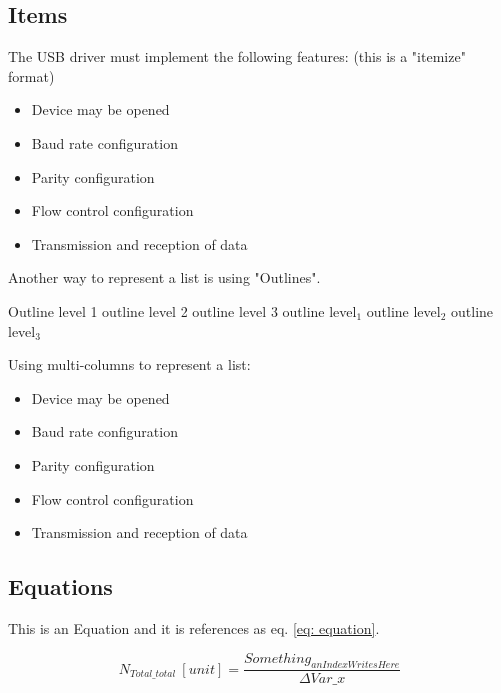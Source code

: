\subsection{Items}
The USB driver must implement the following features: (this is a "itemize" format)

\begin{itemize}
	\item Device may be opened
	\item Baud rate configuration
	\item Parity configuration
	\item Flow control configuration
	\item Transmission and reception of data
\end{itemize}


Another way to represent a list is using "Outlines".

\begin{outline}
	\1 Outline level 1
		\2 outline level 2
			\3 outline level 3
	\1 outline level$_{1}$
		\2 outline level$_{2}$
			\3 outline level$_{3}$
\end{outline}


Using multi-columns to represent a list:
\begin{multicols}{2}
\begin{itemize}
	\item Device may be opened
	\item Baud rate configuration
	\item Parity configuration
	\item Flow control configuration
	\item Transmission and reception of data
\end{itemize}
\end{multicols}



\subsection{Equations}
This is an Equation and it is references as eq. \ref{eq: equation}.

\begin{equation}
\label{eq: equation}
	N_{Total\_total} \ [unit] = \frac{Something_{anIndexWritesHere}}{\Delta Var\_x}
\end{equation}\\




